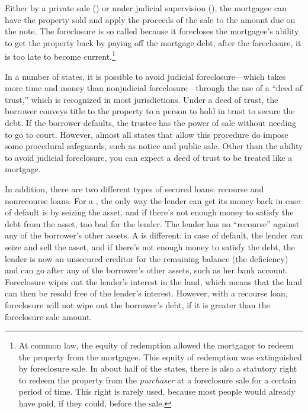 Either by a private sale () or under judicial
supervision (), the mortgagee can have the property
sold and apply the
proceeds of the sale to the amount due on the note.  The foreclosure is so
called because it forecloses the mortgagee's ability to get the property back
by paying off the mortgage debt; after the foreclosure, it is too late to
become current.\footnote{At common law, the equity of redemption allowed the
mortgagor to redeem the property from the mortgagee.  This equity of redemption
was extinguished by foreclosure sale. In about half of the states, there is
also a statutory right to redeem the property from the \textit{purchaser} at a
foreclosure sale for a certain period of time.  This right is rarely used,
because most people would already have paid, if they could, before the sale.}

In a number of states, it is possible to avoid judicial foreclosure---which
takes more time and money than nonjudicial foreclosure---through the use of a
``deed of trust,'' which is recognized in most jurisdictions.  Under a deed of
trust, the borrower conveys title to the property to a person to hold in trust
to secure the debt.  If the borrower defaults, the trustee has the power of
sale without needing to go to court.  However, almost all states that allow
this procedure do impose some procedural safeguards, such as notice and public
sale.  Other than the ability to avoid judicial foreclosure, you can expect a
deed of trust to be treated like a mortgage.

In addition, there are two different types of secured loans: recourse and
nonrecourse loans.  For a , the only way the lender can
get its
money back in case of default is by seizing the asset, and if there's not
enough money to satisfy the debt from the asset, too bad for the lender.  The
lender has no ``recourse'' against any of the borrower's other assets.  A
 is different: in case of default, the lender can seize and
sell
the asset, and if there's not enough money to satisfy the debt, the lender is
now an unsecured creditor for the remaining balance (the deficiency) and can go
after any of the borrower's other assets, such as her bank account. 
Foreclosure wipes out the lender's interest in the land, which means that the
land can then be resold free of the lender's interest.  However, with a
recourse loan, foreclosure will not wipe out the borrower's debt, if it is
greater than the foreclosure sale amount.  

